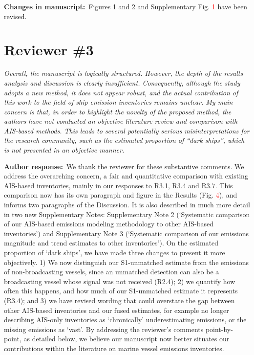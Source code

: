 \documentclass[11pt]{article}
\newcommand{\reviewer}[1]{\bigskip\section*{#1}}
\newcommand{\response}{\par\medskip\noindent%
  \textbf{\textcolor{respblue}{Author response:}}\ }
\newcommand{\changes}{\par\medskip\noindent%
  \textbf{\textcolor{changegreen}{Changes in manuscript:}}\ }
\begin{document}
\changes Figures 1 and 2 and Supplementary Fig. \textcolor{red}{1} have been revised.

\reviewer{Reviewer \#3}

\begin{refquote}\itshape
Overall, the manuscript is logically structured. However, the depth of the
results analysis and discussion is clearly insufficient. Consequently, although
the study adopts a new method, it does not appear robust, and the actual
contribution of this work to the field of ship emission inventories remains
unclear. My main concern is that, in order to highlight the novelty of the
proposed method, the authors have not conducted an objective literature review
and comparison with AIS-based methods. This leads to several potentially serious
misinterpretations for the research community, such as the estimated proportion
of ``dark ships'', which is not presented in an objective manner.
\end{refquote}

\response We thank the reviewer for these substantive comments. We address the overarching concern, a fair and quantitative comparison with existing AIS-based inventories, mainly in our responses to R3.1, R3.4 and R3.7. This comparison now has its own paragraph and figure in the Results (Fig. \textcolor{red}{4}), and informs two paragraphs of the Discussion. It is also described in much more detail in two new Supplementary Notes: Supplementary Note 2 (`Systematic comparison of our AIS-based emissions modeling methodology to other AIS-based inventories') and Supplementary Note 3 (`Systematic comparison of our emissions magnitude and trend estimates to other inventories'). On the estimated proportion of `dark ships', we have made three changes to present it more objectively. 1) We now distinguish our S1-unmatched estimate from the emissions of non-broadcasting vessels, since an unmatched detection can also be a broadcasting vessel whose signal was not received (R2.4); 2) we quantify how often this happens, and how much of our S1-unmatched estimate it represents (R3.4); and 3) we have revised wording that could overstate the gap between other AIS-based inventories and our fused estimates, for example no longer describing AIS-only inventories as `chronically' underestimating emissions, or the missing emissions as `vast'. By addressing the reviewer's comments point-by-point, as detailed below, we believe our manuscript now better situates our contributions within the literature on marine vessel emissions inventories.
\end{document}
